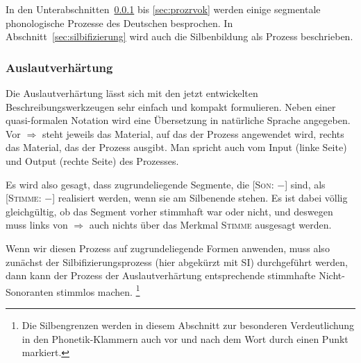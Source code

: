 In den Unterabschnitten~\ref{sec:prozauslautverh} bis \ref{sec:prozrvok} werden einige segmentale phonologische Prozesse des Deutschen besprochen.
In Abschnitt~\ref{sec:silbifizierung} wird auch die Silbenbildung als Prozess beschrieben.

\subsubsection{Auslautverhärtung}

\label{sec:prozauslautverh}

Die Auslautverhärtung lässt sich mit den jetzt entwickelten Beschreibungswerkzeugen sehr einfach und kompakt formulieren.
Neben einer quasi-formalen Notation wird eine Übersetzung in natürliche Sprache angegeben.
Vor $\Rightarrow$ steht jeweils das Material, auf das der Prozess angewendet wird, rechts das Material, das der Prozess ausgibt.
Man spricht auch vom Input (linke Seite) und Output (rechte Seite) des Prozesses.


Es wird also gesagt, dass zugrundeliegende Segmente, die [\textsc{Son}: $-$] sind, als [\textsc{Stimme}: $-$] realisiert werden, wenn sie am Silbenende stehen.
Es ist dabei völlig gleichgültig, ob das Segment vorher stimmhaft war oder nicht, und deswegen muss links von $\Rightarrow$ auch nichts über das Merkmal \textsc{Stimme} ausgesagt werden.

Wenn wir diesen Prozess auf zugrundeliegende Formen anwenden, muss also zunächst der Silbifizierungsprozess (hier abgekürzt mit SI) durchgeführt werden, dann kann der Prozess der Auslautverhärtung entsprechende stimmhafte Nicht-Sonoranten stimmlos machen.%
\footnote{Die Silbengrenzen werden in diesem Abschnitt zur besonderen Verdeutlichung in den Phonetik-Klammern auch vor und nach dem Wort durch einen Punkt markiert.}

\begin{exe}
  \ex\label{ex:phol6726}
  \begin{xlist}
  \end{xlist}
\end{exe}

